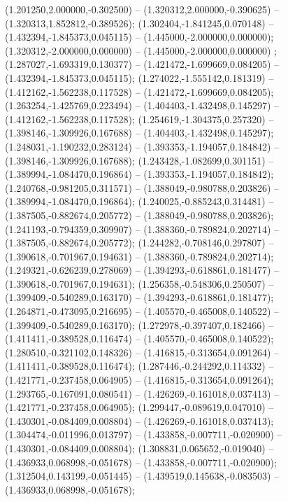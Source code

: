  (1.201250,2.000000,-0.302500) -- (1.320312,2.000000,-0.390625) -- (1.320313,1.852812,-0.389526);
 (1.302404,-1.841245,0.070148) -- (1.432394,-1.845373,0.045115) -- (1.445000,-2.000000,0.000000);
 (1.320312,-2.000000,0.000000) -- (1.445000,-2.000000,0.000000) ;
 (1.287027,-1.693319,0.130377) -- (1.421472,-1.699669,0.084205) -- (1.432394,-1.845373,0.045115);
 (1.274022,-1.555142,0.181319) -- (1.412162,-1.562238,0.117528) -- (1.421472,-1.699669,0.084205);
 (1.263254,-1.425769,0.223494) -- (1.404403,-1.432498,0.145297) -- (1.412162,-1.562238,0.117528);
 (1.254619,-1.304375,0.257320) -- (1.398146,-1.309926,0.167688) -- (1.404403,-1.432498,0.145297);
 (1.248031,-1.190232,0.283124) -- (1.393353,-1.194057,0.184842) -- (1.398146,-1.309926,0.167688);
 (1.243428,-1.082699,0.301151) -- (1.389994,-1.084470,0.196864) -- (1.393353,-1.194057,0.184842);
 (1.240768,-0.981205,0.311571) -- (1.388049,-0.980788,0.203826) -- (1.389994,-1.084470,0.196864);
 (1.240025,-0.885243,0.314481) -- (1.387505,-0.882674,0.205772) -- (1.388049,-0.980788,0.203826);
 (1.241193,-0.794359,0.309907) -- (1.388360,-0.789824,0.202714) -- (1.387505,-0.882674,0.205772);
 (1.244282,-0.708146,0.297807) -- (1.390618,-0.701967,0.194631) -- (1.388360,-0.789824,0.202714);
 (1.249321,-0.626239,0.278069) -- (1.394293,-0.618861,0.181477) -- (1.390618,-0.701967,0.194631);
 (1.256358,-0.548306,0.250507) -- (1.399409,-0.540289,0.163170) -- (1.394293,-0.618861,0.181477);
 (1.264871,-0.473095,0.216695) -- (1.405570,-0.465008,0.140522) -- (1.399409,-0.540289,0.163170);
 (1.272978,-0.397407,0.182466) -- (1.411411,-0.389528,0.116474) -- (1.405570,-0.465008,0.140522);
 (1.280510,-0.321102,0.148326) -- (1.416815,-0.313654,0.091264) -- (1.411411,-0.389528,0.116474);
 (1.287446,-0.244292,0.114332) -- (1.421771,-0.237458,0.064905) -- (1.416815,-0.313654,0.091264);
 (1.293765,-0.167091,0.080541) -- (1.426269,-0.161018,0.037413) -- (1.421771,-0.237458,0.064905);
 (1.299447,-0.089619,0.047010) -- (1.430301,-0.084409,0.008804) -- (1.426269,-0.161018,0.037413);
 (1.304474,-0.011996,0.013797) -- (1.433858,-0.007711,-0.020900) -- (1.430301,-0.084409,0.008804);
 (1.308831,0.065652,-0.019040) -- (1.436933,0.068998,-0.051678) -- (1.433858,-0.007711,-0.020900);
 (1.312504,0.143199,-0.051445) -- (1.439519,0.145638,-0.083503) -- (1.436933,0.068998,-0.051678);

